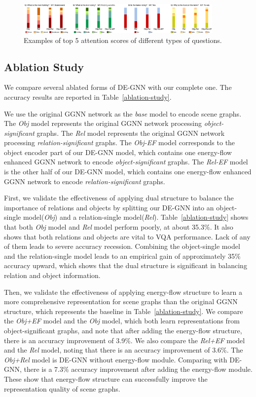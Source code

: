\documentclass[letterpaper]{article} %
\begin{document}
\begin{figure}[ht] 
    \centering 
    \includegraphics[width=0.9\textwidth]{./pic/visual_detail.pdf} 
    \caption{Examples of top 5 attention scores of different types of questions.} 
    \label{visual} 
\end{figure}


\subsection{Ablation Study}
We compare several ablated forms of DE-GNN with our complete one. The accuracy results are reported in Table~\ref{ablation-study}. 

We use the original GGNN network as the \emph{base} model to encode scene graphs.
The \emph{Obj} model represents the original GGNN network processing \emph{object-significant} graphs. The \emph{Rel} model represents the original GGNN network processing \emph{relation-significant} graphs.
The \emph{Obj-EF} model corresponds to the object encoder part of our DE-GNN model, which contains one energy-flow enhanced GGNN network to encode \emph{object-significant} graphs. 
The \emph{Rel-EF} model is the other half of our DE-GNN model, which contains one energy-flow enhanced GGNN network to encode \emph{relation-significant} graphs.

First, we validate the effectiveness of applying dual structure to balance the importance of relations and objects by splitting our DE-GNN into an object-single model(\emph{Obj}) and a relation-single model(\emph{Rel}). Table~\ref{ablation-study} shows that both \emph{Obj} model and \emph{Rel} model perform poorly, at about 35.3\%. It also shows that both relations and objects are vital to VQA performance. Lack of any of them leads to severe accuracy recession. Combining the object-single model and the relation-single model leads to an empirical gain of approximately 35\% accuracy upward, which shows that the dual structure is significant in balancing relation and object information. 

Then, we validate the effectiveness of applying energy-flow structure to learn a more comprehensive representation for scene graphs than the original GGNN structure, which represents the baseline in Table~\ref{ablation-study}. We compare the \emph{Obj+EF} model and the \emph{Obj} model, which both learn representations from object-significant graphs, and note that after adding the energy-flow structure, there is an accuracy improvement of 3.9\%. We also compare the \emph{Rel+EF} model and the \emph{Rel} model, noting that there is an accuracy improvement of 3.6\%. The \emph{Obj+Rel} model is DE-GNN without energy-flow module. Comparing with DE-GNN, there is a 7.3\% accuracy improvement after adding the energy-flow module. These show that energy-flow structure can successfully improve the representation quality of scene graphs. 
\end{document}
